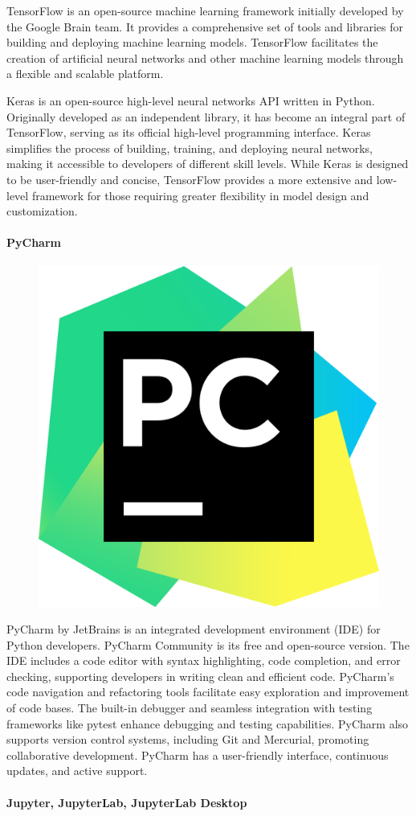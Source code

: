 TensorFlow is an open-source machine learning framework initially developed by the Google Brain team. It provides a comprehensive set of tools and libraries for building and deploying machine learning models. TensorFlow facilitates the creation of artificial neural networks and other machine learning models through a flexible and scalable platform. 

Keras is an open-source high-level neural networks API written in Python. Originally developed as an independent library, it has become an integral part of TensorFlow, serving as its official high-level programming interface. Keras simplifies the process of building, training, and deploying neural networks, making it accessible to developers of different skill levels. While Keras is designed to be user-friendly and concise, TensorFlow provides a more extensive and low-level framework for those requiring greater flexibility in model design and customization. 

\paragraph*{PyCharm} 

\begin{figure}
\begin{center}
\includegraphics[height=.5in]{PyCharm_icon.png}
\end{center}
\end{figure}

PyCharm by JetBrains is an integrated development environment (IDE) for Python developers. PyCharm Community is its free and open-source version. The IDE includes a code editor with syntax highlighting, code completion, and error checking, supporting developers in writing clean and efficient code. PyCharm's code navigation and refactoring tools facilitate easy exploration and improvement of code bases. The built-in debugger and seamless integration with testing frameworks like pytest enhance debugging and testing capabilities. PyCharm also supports version control systems, including Git and Mercurial, promoting collaborative development. PyCharm has a user-friendly interface, continuous updates, and active support.

\paragraph*{Jupyter, JupyterLab, JupyterLab Desktop} 


